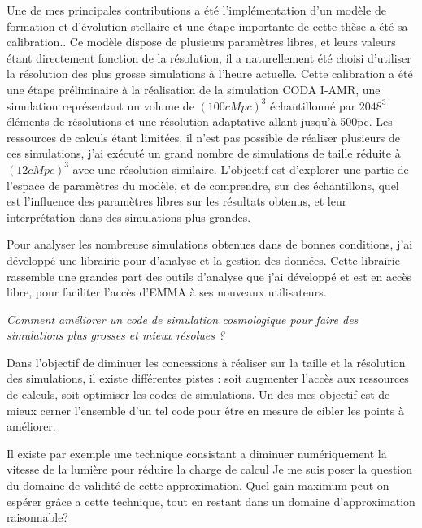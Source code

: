 Une de mes principales contributions a été l'implémentation d'un modèle de formation et d'évolution stellaire et une étape importante de cette thèse a été sa calibration..
Ce modèle dispose de plusieurs paramètres libres, et leurs valeurs étant directement fonction de la résolution, il a naturellement été choisi d'utiliser la résolution des plus grosse simulations à l'heure actuelle.
Cette calibration a été une étape préliminaire à la réalisation de la simulation CODA I-AMR, une simulation représentant un volume de $(100 cMpc)^3$ échantillonné par $2048^3$ éléments de résolutions et une résolution adaptative allant jusqu'à 500pc.
Les ressources de calculs étant limitées, il n'est pas possible de réaliser plusieurs de ces simulations, j'ai exécuté un grand nombre de simulations de taille réduite à $(12 cMpc)^3$ avec une résolution similaire. 
L'objectif est d'explorer une partie de l'espace de paramètres du modèle, et de comprendre, sur des échantillons, quel est l'influence des paramètres libres sur les résultats obtenus, et leur interprétation dans des simulations plus grandes.



Pour analyser les nombreuse simulations obtenues dans de bonnes conditions, j'ai développé une librairie pour d'analyse et la gestion des données.
Cette librairie rassemble une grandes part des outils d’analyse que j'ai développé et est en accès libre, pour faciliter l'accès d'EMMA à ses nouveaux utilisateurs.

\textit{Comment améliorer un code de simulation cosmologique pour faire des simulations plus grosses et mieux résolues ?}

Dans l'objectif de diminuer les concessions à réaliser sur la taille et la résolution des simulations, il existe différentes pistes : soit augmenter l'accès aux ressources de calculs, soit optimiser les codes de simulations.
Un des mes objectif est de mieux cerner l'ensemble d'un tel code pour être en mesure de cibler les points à améliorer.

Il existe par exemple une technique consistant a diminuer numériquement  la vitesse de la lumière pour réduire la charge de calcul
Je me suis poser la question du domaine de validité de cette approximation.
Quel gain maximum peut on espérer grâce a cette technique, tout en restant dans un domaine d'approximation raisonnable?

